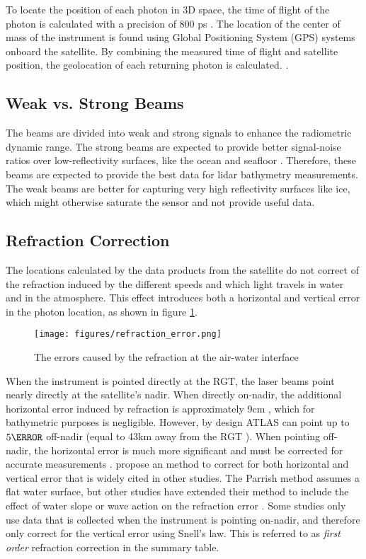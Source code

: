 To locate the position of each photon in 3D space, the time of flight of the photon is calculated with a precision of 800 ps \parencite{Neumann2019d}. The location of the center of mass of the instrument is found using Global Positioning System (GPS) systems onboard the satellite. By combining the measured time of flight and satellite position, the geolocation of each returning photon is calculated. \parencite{Neumann2019d}.

\subsection{Weak vs. Strong Beams}

The beams are divided into weak and strong signals to enhance the radiometric dynamic range. The strong beams are expected to provide better signal-noise ratios over low-reflectivity surfaces, like the ocean and seafloor \parencite{Neumann2019d}. Therefore, these beams are expected to provide the best data for lidar bathymetry measurements. The weak beams are better for capturing very high reflectivity surfaces like ice, which might otherwise saturate the sensor and not provide useful data.

\subsection{Refraction Correction}

The locations calculated by the data products from the satellite do not correct of the refraction induced by the different speeds and which light travels in water and in the atmosphere. This effect introduces both a horizontal and vertical error in the photon location, as shown in figure \ref{refract-image}.

\begin{figure}[ht]
      \centering
      \texttt{[image: figures/refraction\_error.png]}
      \caption{The errors caused by the refraction at the air-water interface}
      \label{refract-image}
\end{figure}

When the instrument is pointed directly at the RGT, the laser beams point nearly directly at the satellite's nadir. When directly on-nadir, the additional horizontal error induced by refraction is approximately 9cm \parencite{Parrish2019}, which for bathymetric purposes is negligible. However, by design ATLAS can point up to $5 \degree$ off-nadir (equal to 43km away from the RGT \parencite{Magruder2021}). When pointing off-nadir, the horizontal error is much more significant and must be corrected for accurate measurements \parencite{Parrish2019}.\citeauthor{Parrish2019} propose an method to correct for both horizontal and vertical error that is widely cited in other studies. The Parrish method assumes a flat water surface, but other studies have extended their method to include the effect of water slope or wave action on the refraction error \parencite{Ma2020,Zhang2022}. Some studies only use data that is collected when the instrument is pointing on-nadir, and therefore only correct for the vertical error using Snell's law. This is referred to as \emph{first order} refraction correction in the summary table.

